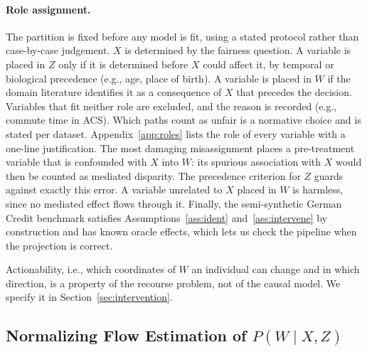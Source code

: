 \paragraph{Role assignment.}
The partition is fixed before any model is fit, using a stated protocol rather
than case-by-case judgement.
$X$ is determined by the fairness question.
A variable is placed in $Z$ only if it is determined before $X$ could affect
it, by temporal or biological precedence (e.g., age, place of birth).
A variable is placed in $W$ if the domain literature identifies it as a
consequence of $X$ that precedes the decision. Variables that fit neither role
are excluded, and the reason is recorded (e.g., commute time in ACS).
Which paths count as unfair is a normative choice and is stated per dataset.
Appendix~\ref{app:roles} lists the role of every variable with a one-line
justification. The most damaging misassignment places a pre-treatment
variable that is confounded with $X$ into $W$: its spurious association with
$X$ would then be counted as mediated disparity. The precedence criterion for
$Z$ guards against exactly this error. A variable unrelated to $X$ placed in
$W$ is harmless, since no mediated effect flows through it. Finally, the
semi-synthetic German Credit benchmark satisfies Assumptions~\ref{ass:ident}
and~\ref{ass:intervene} by construction and has known oracle effects, which
lets us check the pipeline when the projection is correct.

Actionability, i.e., which coordinates of $W$ an individual can change and in
which direction, is a property of the recourse problem, not of the causal
model. We specify it in Section~\ref{sec:intervention}.

\subsection{Normalizing Flow Estimation of $P(W\mid X,Z)$}
\label{sec:flows}

